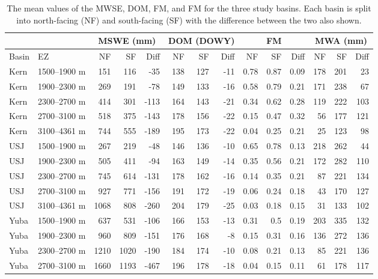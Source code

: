 \begin{table}[htbp]
\centering
\caption{The mean values of the MWSE, DOM, FM, and FM for the three study basins. Each basin is split into north-facing (NF) and south-facing (SF) with the difference between the two also shown.}
\label{tab:snow_metric_table}
\tiny %
\begin{tabular}{llrrrrrrrrrrrr}
\toprule
& & \multicolumn{3}{c}{MSWE (mm)} & \multicolumn{3}{c}{DOM (DOWY)} & \multicolumn{3}{c}{FM} & \multicolumn{3}{c}{MWA (mm)} \\
\midrule
Basin & EZ & NF & SF & Diff & NF & SF & Diff & NF & SF & Diff & NF & SF & Diff \\
\midrule
Kern & 1500--1900 m & 151 & 116 & -35 & 138 & 127 & -11 & 0.78 & 0.87 & 0.09 & 178 & 201 & 23 \\
Kern & 1900--2300 m & 269 & 191 & -78 & 149 & 133 & -16 & 0.58 & 0.79 & 0.21 & 171 & 238 & 67 \\
Kern & 2300--2700 m & 414 & 301 & -113 & 164 & 143 & -21 & 0.34 & 0.62 & 0.28 & 119 & 222 & 103 \\
Kern & 2700--3100 m & 518 & 375 & -143 & 178 & 156 & -22 & 0.15 & 0.47 & 0.32 & 56 & 177 & 121 \\
Kern & 3100--4361 m & 744 & 555 & -189 & 195 & 173 & -22 & 0.04 & 0.25 & 0.21 & 25 & 123 & 98 \\
USJ & 1500--1900 m & 267 & 219 & -48 & 146 & 136 & -10 & 0.65 & 0.78 & 0.13 & 218 & 262 & 44 \\
USJ & 1900--2300 m & 505 & 411 & -94 & 163 & 149 & -14 & 0.35 & 0.56 & 0.21 & 172 & 282 & 110 \\
USJ & 2300--2700 m & 745 & 614 & -131 & 178 & 162 & -16 & 0.14 & 0.35 & 0.21 & 87 & 221 & 134 \\
USJ & 2700--3100 m & 927 & 771 & -156 & 191 & 172 & -19 & 0.06 & 0.24 & 0.18 & 43 & 170 & 127 \\
USJ & 3100--4361 m & 1068 & 808 & -260 & 204 & 179 & -25 & 0.03 & 0.18 & 0.15 & 31 & 133 & 102 \\
Yuba & 1500--1900 m & 637 & 531 & -106 & 166 & 153 & -13 & 0.31 & 0.5 & 0.19 & 203 & 335 & 132 \\
Yuba & 1900--2300 m & 960 & 809 & -151 & 176 & 168 & -8 & 0.15 & 0.31 & 0.16 & 136 & 272 & 136 \\
Yuba & 2300--2700 m & 1210 & 1020 & -190 & 184 & 174 & -10 & 0.08 & 0.21 & 0.13 & 85 & 221 & 136 \\
Yuba & 2700--3100 m & 1660 & 1193 & -467 & 196 & 178 & -18 & 0.04 & 0.15 & 0.11 & 61 & 178 & 117 \\
\bottomrule
\end{tabular}
\end{table}


